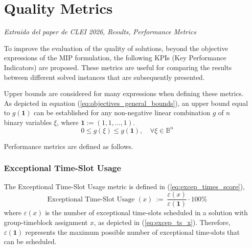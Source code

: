 \section{Quality Metrics}


\textit{Extraido del paper de CLEI 2026, Results, Performance Metrics}
    
        To improve the evaluation of the quality of solutions, beyond the objective expressions of the MIP formulation, the following KPIs (Key Performance Indicators) are proposed. These metrics are useful for comparing the results between different solved instances that are subsequently presented. 

        Upper bounds are considered for many expressions when defining these metrics. As depicted in equation (\ref{eq:objectives_general_bounds}), an upper bound equal to $g(\mathbf{1})$ can be established for any non-negative linear combination $g$ of $n$ binary variables $\xi$, where $\mathbf{1}:=(1,1,\dots,1)$.
        \begin{equation}
            0 \leq g(\xi) \leq g(\mathbf{1}), \quad \forall \xi \in \mathbb{B}^{n}
            \label{eq:objectives_general_bounds}
        \end{equation}

        Performance metrics are defined as follows.
    \vspace{1em}
    \subsubsection{Exceptional Time-Slot Usage}


        The Exceptional Time-Slot Usage metric is defined in (\ref{eq:excep_times_score}), 
        \begin{equation}
            \text{Exceptional Time-Slot Usage } (x) \ := \ \frac{\varepsilon(x)}{\varepsilon(\mathbf{1})} \cdot 100\%
            \label{eq:excep_times_score}
        \end{equation}
        where $\varepsilon(x)$ is the number of exceptional time-slots scheduled in a solution with group-timeblock assignment $x$, as depicted in (\ref{eq:excep_ts_x}). Therefore, $\varepsilon(\mathbf{1})$ represents the maximum possible number of exceptional time-slots that can be scheduled.
        
